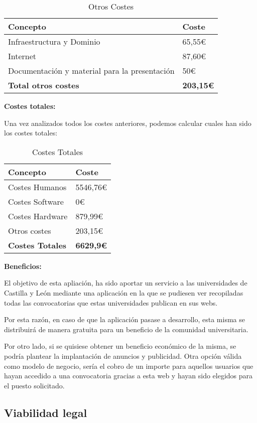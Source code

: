 \begin{table}[H]
    \centering
    \renewcommand{\arraystretch}{1.2}
    \setlength{\tabcolsep}{20pt}
    \begin{tabular}{l l}
        \hline
        \textbf{Concepto} & \textbf{Coste} \\ \hline
        Infraestructura y Dominio & 65,55€ \\
        Internet  & 87,60€\\
        Documentación y material para la presentación & 50€\\  \hline
        \textbf{Total otros costes} & \textbf{203,15€}\\ \hline
    \end{tabular}
    \caption{Otros Costes}
    \label{tab:otros_costes}
\end{table}


\textbf{Costes totales:}

Una vez analizados todos los costes anteriores, podemos calcular cuales han sido los costes totales:

\begin{table}[H]
    \centering
    \renewcommand{\arraystretch}{1.2}
    \setlength{\tabcolsep}{20pt}
    \begin{tabular}{l l}
        \hline
        \textbf{Concepto} & \textbf{Coste} \\ \hline
        Costes Humanos & 5546,76€ \\
        Costes Software & 0€ \\
        Costes Hardware  & 879,99€\\
        Otros costes & 203,15€\\  \hline
        \textbf{Costes Totales} & \textbf{6629,9€}\\ \hline
    \end{tabular}
    \caption{Costes Totales}
    \label{tab:costes_totales}
\end{table}

\textbf{Beneficios:}

El objetivo de esta apliación, ha sido aportar un servicio a las universidades de Castilla y León mediante una aplicación en la que se pudiesen ver recopiladas todas las convocatorias que estas universidades publican en sus webs. 

Por esta razón, en caso de que la aplicación pasase a desarrollo, esta misma se distribuirá de manera gratuita para un beneficio de la comunidad universitaria.

Por otro lado, si se quisiese obtener un beneficio económico de la misma, se podría plantear la implantación de anuncios y publicidad. Otra opción válida como modelo de negocio, sería el cobro de un importe para aquellos usuarios que hayan accedido a una convocatoria gracias a esta web y hayan sido elegidos para el puesto solicitado.

\subsection{Viabilidad legal}


